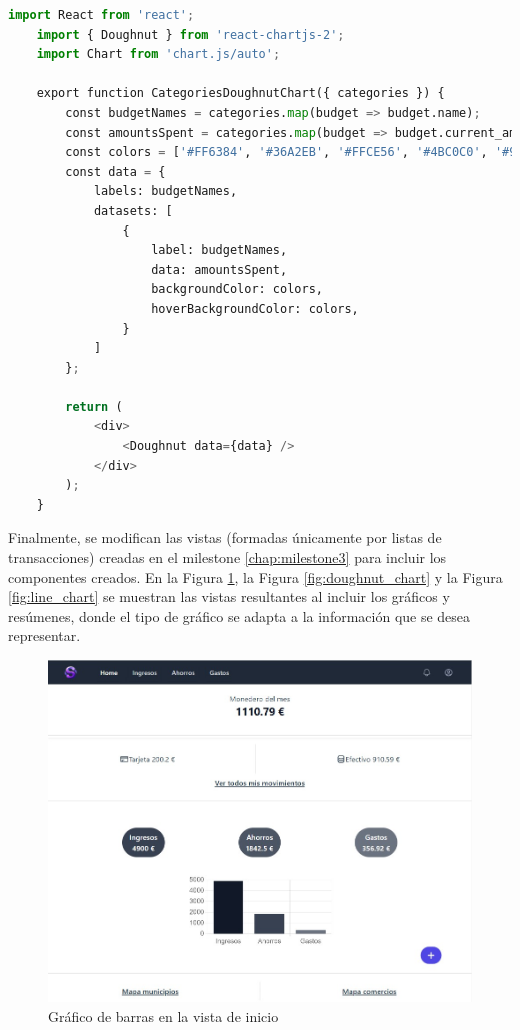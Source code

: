 \begin{lstlisting}[language=Python, caption=Componente de React para el gráfico de tipo donut, label=cod:donut]
    import React from 'react';
    import { Doughnut } from 'react-chartjs-2';
    import Chart from 'chart.js/auto';
    
    export function CategoriesDoughnutChart({ categories }) {
        const budgetNames = categories.map(budget => budget.name);
        const amountsSpent = categories.map(budget => budget.current_amount_spent);
        const colors = ['#FF6384', '#36A2EB', '#FFCE56', '#4BC0C0', '#9966FF', '#FF9F40'];
        const data = {
            labels: budgetNames,
            datasets: [
                {
                    label: budgetNames,
                    data: amountsSpent,
                    backgroundColor: colors,
                    hoverBackgroundColor: colors,
                }
            ]
        };
    
        return (
            <div>
                <Doughnut data={data} />
            </div>
        );
    }    
\end{lstlisting}


Finalmente, se modifican las vistas (formadas únicamente por listas de transacciones) creadas en el milestone \ref{chap:milestone3} para incluir los componentes creados. En la Figura \ref{fig:bar_chart}, la Figura \ref{fig:doughnut_chart} y la Figura \ref{fig:line_chart} se muestran las vistas resultantes al incluir los gráficos y resúmenes, donde el tipo de gráfico se adapta a la información que se desea representar.

\begin{figure}[ht!]
    \centering
    \includegraphics[width=\linewidth]{imagenes/M3-home.jpg}
    \caption{Gráfico de barras en la vista de inicio}
    \label{fig:bar_chart}
\end{figure}

